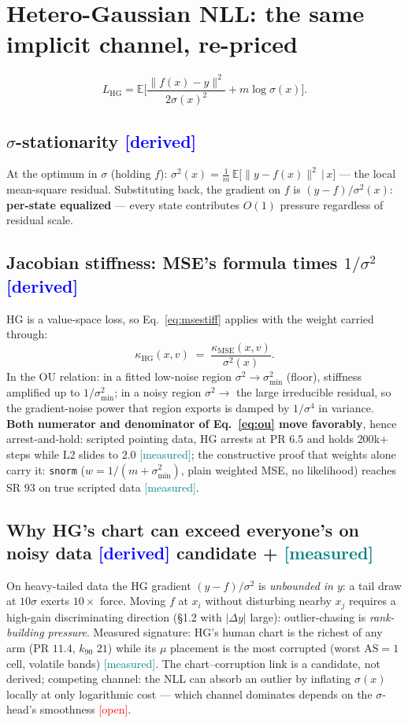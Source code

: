 \documentclass[10pt]{article}
\newcommand{\tagd}{{\small\textcolor{blue}{[derived]}}}
\newcommand{\tagm}{{\small\textcolor{teal}{[measured]}}}
\newcommand{\tago}{{\small\textcolor{red}{[open]}}}
\begin{document}
\section{Hetero-Gaussian NLL: the same implicit channel, re-priced}

\begin{equation}
L_{\mathrm{HG}} = \mathbb{E}\Big[\frac{\|f(x)-y\|^{2}}{2\sigma(x)^{2}}
 + m\log\sigma(x)\Big].
\end{equation}

\subsection{$\sigma$-stationarity \hfill \tagd}
At the optimum in $\sigma$ (holding $f$):
$\sigma^{2}(x) = \frac1m\,\mathbb{E}\big[\|y-f(x)\|^{2}\,\big|\,x\big]$ ---
the local mean-square residual. Substituting back, the gradient on $f$ is
$(y-f)/\sigma^{2}(x)$: \textbf{per-state equalized} --- every state
contributes $O(1)$ pressure regardless of residual scale.

\subsection{Jacobian stiffness: MSE's formula times $1/\sigma^{2}$
\hfill \tagd}
HG is a value-space loss, so Eq.~\eqref{eq:msestiff} applies with the weight
carried through:
\begin{equation}
\kappa_{\mathrm{HG}}(x,v) \;=\; \frac{\kappa_{\mathrm{MSE}}(x,v)}{\sigma^{2}(x)}.
\end{equation}
In the OU relation: in a fitted low-noise region
$\sigma^{2}\!\to\!\sigma_{\min}^{2}$ (floor), stiffness amplified up to
$1/\sigma_{\min}^{2}$; in a noisy region $\sigma^{2}\!\to$ the large
irreducible residual, so the gradient-noise power that region exports is
damped by $1/\sigma^{4}$ in variance. \textbf{Both numerator and denominator
of Eq.~\eqref{eq:ou} move favorably}, hence arrest-and-hold: scripted pointing
data, HG arrests at PR $6.5$ and holds $200$k$+$ steps while L2 slides to
$2.0$ \tagm; the constructive proof that weights alone carry it: \texttt{snorm}
($w = 1/(m+\sigma_{\min}^{2})$, plain weighted MSE, no likelihood) reaches SR
$93$ on true scripted data \tagm.

\subsection{Why HG's chart can exceed everyone's on noisy data
\hfill \tagd{} candidate + \tagm}
On heavy-tailed data the HG gradient $(y-f)/\sigma^{2}$ is \emph{unbounded in
$y$}: a tail draw at $10\sigma$ exerts $10\times$ force. Moving $f$ at $x_i$
without disturbing nearby $x_j$ requires a high-gain discriminating direction
(\S1.2 with $|\Delta y|$ large): outlier-chasing is \emph{rank-building
pressure}. Measured signature: HG's human chart is the richest of any arm
(PR $11.4$, $k_{90}$ $21$) while its $\mu$ placement is the most corrupted
(worst AS$=1$ cell, volatile bands) \tagm. The chart--corruption link is a
candidate, not derived; competing channel: the NLL can absorb an outlier by
inflating $\sigma(x)$ locally at only logarithmic cost --- which channel
dominates depends on the $\sigma$-head's smoothness \tago.
\end{document}
